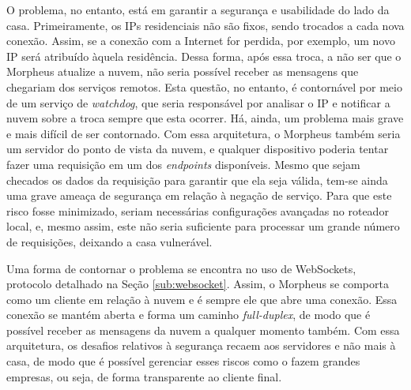 O problema, no entanto, está em garantir a segurança e usabilidade do lado da casa. Primeiramente, os IPs residenciais não são fixos, sendo trocados a cada nova conexão. Assim, se a conexão com a Internet for perdida, por exemplo, um novo IP será atribuído àquela residência. Dessa forma, após essa troca, a não ser que o Morpheus atualize a nuvem, não seria possível receber as mensagens que chegariam dos serviços remotos. Esta questão, no entanto, é contornável por meio de um serviço de \emph{watchdog}, que seria responsável por analisar o IP e notificar a nuvem sobre a troca sempre que esta ocorrer. Há, ainda, um problema mais grave e mais difícil de ser contornado. Com essa arquitetura, o Morpheus também seria um servidor do ponto de vista da nuvem, e qualquer dispositivo poderia tentar fazer uma requisição em um dos \emph{endpoints} disponíveis. Mesmo que sejam checados os dados da requisição para garantir que ela seja válida, tem-se ainda uma grave ameaça de segurança em relação à negação de serviço. Para que este risco fosse minimizado, seriam necessárias configurações avançadas no roteador local, e, mesmo assim, este não seria suficiente para processar um grande número de requisições, deixando a casa vulnerável.

Uma forma de contornar o problema se encontra no uso de WebSockets, protocolo detalhado na Seção \ref{sub:websocket}. Assim, o Morpheus se comporta como um cliente em relação à nuvem e é sempre ele que abre uma conexão. Essa conexão se mantém aberta e forma um caminho \emph{full-duplex}, de modo que é possível receber as mensagens da nuvem a qualquer momento também. Com essa arquitetura, os desafios relativos à segurança recaem aos servidores e não mais à casa, de modo que é possível gerenciar esses riscos como o fazem grandes empresas, ou seja, de forma transparente ao cliente final.
